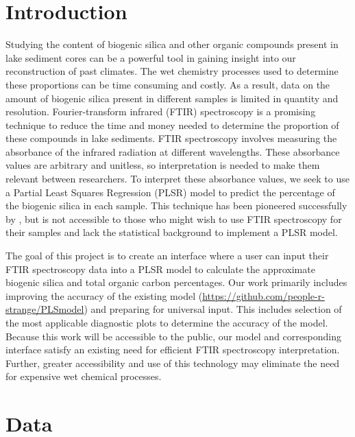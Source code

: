 \documentclass[water,article,submit,moreauthors,pdftex]{mdpi}
\begin{document}

\hypertarget{introduction}{%
\section{Introduction}\label{introduction}}

Studying the content of biogenic silica and other organic compounds
present in lake sediment cores can be a powerful tool in gaining insight
into our reconstruction of past climates. The wet chemistry processes
used to determine these proportions can be time consuming and costly. As
a result, data on the amount of biogenic silica present in different
samples is limited in quantity and resolution. Fourier-transform
infrared (FTIR) spectroscopy is a promising technique to reduce the time
and money needed to determine the proportion of these compounds in lake
sediments. FTIR spectroscopy involves measuring the absorbance of the
infrared radiation at different wavelengths. These absorbance values are
arbitrary and unitless, so interpretation is needed to make them
relevant between researchers. To interpret these absorbance values, we
seek to use a Partial Least Squares Regression (PLSR) model to predict
the percentage of the biogenic silica in each sample. This technique has
been pioneered successfully by \citet{vogel2008fourier}, but is not
accessible to those who might wish to use FTIR spectroscopy for their
samples and lack the statistical background to implement a PLSR model.

The goal of this project is to create an interface where a user can
input their FTIR spectroscopy data into a PLSR model to calculate the
approximate biogenic silica and total organic carbon percentages. Our
work primarily includes improving the accuracy of the existing model
(\url{https://github.com/people-r-strange/PLSmodel}) and preparing for
universal input. This includes selection of the most applicable
diagnostic plots to determine the accuracy of the model. Because this
work will be accessible to the public, our model and corresponding
interface satisfy an existing need for efficient FTIR spectroscopy
interpretation. Further, greater accessibility and use of this
technology may eliminate the need for expensive wet chemical processes.

\hypertarget{data}{%
\section{Data}\label{data}}
\end{document}
